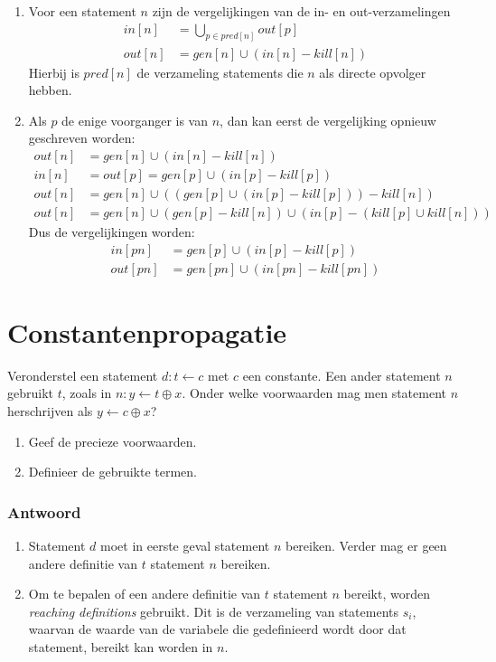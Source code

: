 \documentclass{report}
\newcommand{\answer}[1]{
		\subsubsection*{Antwoord}
			#1
}
\begin{document}
{\begin{enumerate}
\begin{enumerate}
				Dode code elmination verwijdert statements die nergens gebruikt worden. Stel een definitie $s : a \leftarrow b$. Als $a$ niet live-out $s$ is, dan kan $s$ verwijderd worden. Dit wordt geïmplementeerd via de out-verzamelingen bij liveness analyse.
			\end{enumerate}
			\item Voor een statement $n$ zijn de vergelijkingen van de in- en out-verzamelingen
			\begin{align*}
				in[n]  &= \bigcup_{p \in pred[n]} out[p] \\
				out[n] &= gen[n] \cup (in[n] - kill[n])
			\end{align*}
			Hierbij is $pred[n]$ de verzameling statements die $n$ als directe opvolger hebben.

			\item Als $p$ de enige voorganger is van $n$, dan kan eerst de vergelijking opnieuw geschreven worden:
			\begin{align*}
				out[n] &= gen[n] \cup (in[n] - kill[n]) \\
				in[n] & = out[p] = gen[p] \cup (in[p] - kill[p])\\
				out[n] & = gen[n] \cup ((gen[p] \cup (in[p] - kill[p])) - kill[n]) \\
				out[n] & = gen[n] \cup (gen[p] - kill[n]) \cup (in[p] - (kill[p] \cup kill[n]))
			\end{align*}
			Dus de vergelijkingen worden:
			\begin{align*}
				in[pn] & = gen[p] \cup (in[p] - kill[p])\\
				out[pn] & = gen[pn] \cup (in[pn] - kill[pn])
			\end{align*}
		\end{enumerate}
	}
		\newpage
\section{Constantenpropagatie}
	Veronderstel een statement $d : t \leftarrow c$ met $c$ een constante. Een ander statement $n$ gebruikt $t$, zoals in $n : y \leftarrow t \oplus x$. Onder welke voorwaarden mag men statement $n$ herschrijven als $y \leftarrow c \oplus x$?
	\begin{enumerate}
		\item Geef de precieze voorwaarden.
		\item Definieer de gebruikte termen.
	\end{enumerate}
	\answer{
		\begin{enumerate}
			\item Statement $d$ moet in eerste geval statement $n$ bereiken. Verder mag er geen andere definitie van $t$ statement $n$ bereiken.
			\item Om te bepalen of een andere definitie van $t$ statement $n$ bereikt, worden \textit{reaching definitions} gebruikt. Dit is de verzameling van statements $s_i$, waarvan de waarde van de variabele die gedefinieerd wordt door dat statement, bereikt kan worden in $n$.  
		\end{enumerate}
	}
\end{document}
